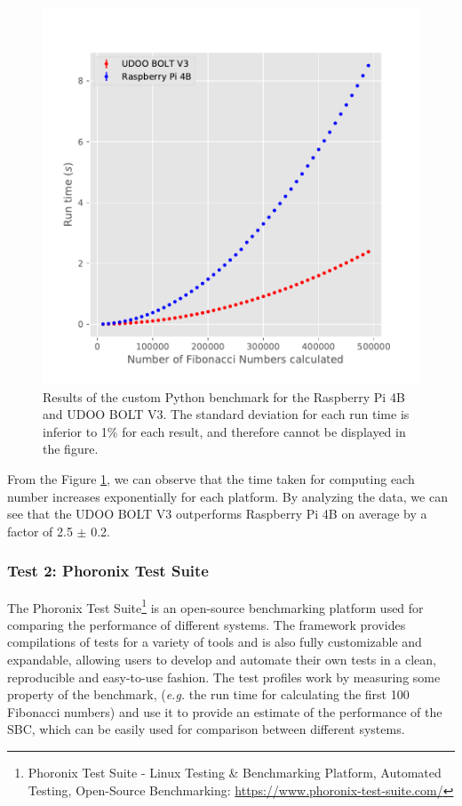 \begin{figure}[H]
    \centering
    \includegraphics[width=0.8 \linewidth]{images/fibonacci-test.pdf}
    \caption [Results of the custom Python benchmark for the Raspberry Pi 4B and UDOO BOLT V3.]{ Results of the custom Python benchmark for the Raspberry Pi 4B and UDOO BOLT V3. The standard deviation for each run time is inferior to 1\% for each result, and therefore cannot be displayed in the figure.}
    \label{fig:fibonacci-tests}
\end{figure}

From the Figure \ref{fig:fibonacci-tests}, we can observe that the time taken for computing each number increases exponentially for each platform. By analyzing the data, we can see that the UDOO BOLT V3 outperforms Raspberry Pi 4B on average by a factor of 2.5 $\pm$ 0.2.

\subsubsection{Test 2: Phoronix Test Suite}

The Phoronix Test Suite\footnote{Phoronix Test Suite - Linux Testing \& Benchmarking Platform, Automated Testing, Open-Source Benchmarking: \url{https://www.phoronix-test-suite.com/}} is an open-source benchmarking platform used for comparing the performance of different systems. The framework provides compilations of tests for a variety of tools and is also fully customizable and expandable, allowing users to develop and automate their own tests in a clean, reproducible and easy-to-use fashion. The test profiles work by measuring some property of the benchmark, (\textit{e.g.} the run time for calculating the first 100 Fibonacci numbers) and use it to provide an estimate of the performance of the \acs{SBC}, which can be easily used for comparison between different systems. 

